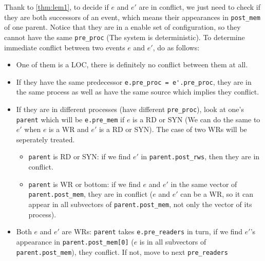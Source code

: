 \documentclass{llncs}
\begin{document}
	\noindent
	Thank to \autoref{thm:lem1}, to decide if $e$ and $e'$ are in conflict, we just need to check if
	they are both successors of an event, which means their appearances in \verb!post_mem! of one 
	parent.
	Notice that they are in a enable set of configuration, so they cannot have the same 
	\verb!pre_proc! (The system is deterministic). To determine immediate conflict between two
	events $e$ and $e'$, do as follows: 
	\begin{itemize}
	\item
		One of them is a LOC, there is definitely no conflict between them at all.
	\item
		If they have the same predecessor \verb!e.pre_proc = e'.pre_proc!, they are in the same
		process as well as have the same source which implies they conflict.
	\item
		If they are in different processes (have different \verb!pre_proc!), look at one's 
		\verb!parent! which will be \verb!e.pre_mem! 		if $e$ is a RD or SYN (We can do the
		same to $e'$ when $e$ is a WR and $e'$ is a RD or SYN). The case of two WRs will be
		seperately treated.
		\begin{itemize}
		\item
			\verb!parent! is RD or SYN: if we find $e'$ in \verb!parent.post_rws!, then they are in
			conflict.
		\item
			\verb!parent! is WR or bottom: if we find $e$ and $e'$ in the same vector of
			\verb!parent.post_mem!, they are in conflict ($e$ and $e'$ can be a WR, so it can appear
			 in all subvectors of \verb!parent.post_mem!, not only the vector of its process).
	\end{itemize}
	\item
		Both $e$ and $e'$ are WRs: \verb!parent! takes \verb!e.pre_readers! in turn, if we find $e'$'s appearance in \verb!parent.post_mem[0]! ($e$ is in all subvectors of \verb!parent.post_mem!), they conflict. If not, move to next \verb!pre_readers!
	
\end{itemize}
\end{document}
